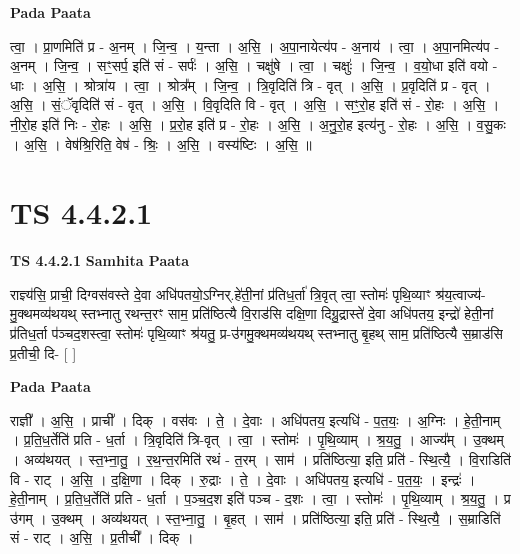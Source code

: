 \documentclass[17pt]{extarticle}
\begin{document}
\textbf{Pada Paata} \newline

त्वा॒ । प्रा॒णमिति॑ प्र - अ॒नम् । जि॒न्व॒ । य॒न्ता । अ॒सि॒ । अ॒पा॒नायेत्य॑प - अ॒नाय॑ । त्वा॒ । अ॒पा॒नमित्य॑प - अ॒नम् । जि॒न्व॒ । सꣳ॒॒सर्प॒ इति॑ सं - सर्पः॑ । अ॒सि॒ । चक्षु॑षे । त्वा॒ । चक्षुः॑ । जि॒न्व॒ । व॒यो॒धा इति॑ वयो - धाः । अ॒सि॒ । श्रोत्रा॑य । त्वा॒ । श्रोत्र᳚म् । जि॒न्व॒ । त्रि॒वृदिति॑ त्रि - वृत् । अ॒सि॒ । प्र॒वृदिति॑ प्र - वृत् । अ॒सि॒ । सं॒ॅवृदिति॑ सं - वृत् । अ॒सि॒ । वि॒वृदिति वि - वृत् । अ॒सि॒ । सꣳ॒॒रो॒ह इति॑ सं - रो॒हः । अ॒सि॒ । नी॒रो॒ह इति॑ निः - रो॒हः । अ॒सि॒ । प्र॒रो॒ह इति॑ प्र - रो॒हः । अ॒सि॒ । अ॒नु॒रो॒ह इत्य॑नु - रो॒हः । अ॒सि॒ । व॒सु॒कः । अ॒सि॒ । वेष॑श्रि॒रिति॒ वेष॑ - श्रिः॒ । अ॒सि॒ । वस्य॑ष्टिः । अ॒सि॒ ॥  \newline




\section*{ TS 4.4.2.1 }

\textbf{TS 4.4.2.1 } \newline
\textbf{Samhita Paata} \newline

राज्ञ्य॑सि॒ प्राची॒ दिग्वस॑वस्ते दे॒वा अधि॑पतयो॒ऽग्निर्.हे॑ती॒नां प्र॑तिध॒र्ता॑ त्रि॒वृत् त्वा॒ स्तोमः॑ पृथि॒व्याꣳ श्र॑य॒त्वाज्य॑-मु॒क्थमव्य॑थयथ् स्तभ्नातु रथन्त॒रꣳ साम॒ प्रति॑ष्ठित्यै वि॒राड॑सि दक्षि॒णा दिग्रु॒द्रास्ते॑ दे॒वा अधि॑पतय॒ इन्द्रो॑ हेती॒नां प्र॑तिध॒र्ता प॑ञ्चद॒शस्त्वा॒ स्तोमः॑ पृथि॒व्याꣳ श्र॑यतु॒ प्र-उ॑गमु॒क्थमव्य॑थयथ् स्तभ्नातु बृ॒हथ् साम॒ प्रति॑ष्ठित्यै स॒म्राड॑सि प्र॒तीची॒ दि- [  ] \newline

\textbf{Pada Paata} \newline

राज्ञी᳚ । अ॒सि॒ । प्राची᳚ । दिक् । वस॑वः । ते॒ । दे॒वाः । अधि॑पतय॒ इत्यधि॑ - प॒त॒यः॒ । अ॒ग्निः । हे॒ती॒नाम् । प्र॒ति॒ध॒र्तेति॑ प्रति - ध॒र्ता । त्रि॒वृदिति॑ त्रि-वृत् । त्वा॒ । स्तोमः॑ । पृ॒थि॒व्याम् । श्र॒य॒तु॒ । आज्य᳚म् । उ॒क्थम् । अव्य॑थयत् । स्त॒भ्ना॒तु॒ । र॒थ॒न्त॒रमिति॑ रथं - त॒रम् । साम॑ । प्रति॑ष्ठित्या॒ इति॒ प्रति॑ - स्थि॒त्यै॒ । वि॒राडिति॑ वि - राट् । अ॒सि॒ । द॒क्षि॒णा । दिक् । रु॒द्राः । ते॒ । दे॒वाः । अधि॑पतय॒ इत्यधि॑ - प॒त॒यः॒ । इन्द्रः॑ । हे॒ती॒नाम् । प्र॒ति॒ध॒र्तेति॑ प्रति - ध॒र्ता । प॒ञ्च॒द॒श इति॑ पञ्च - द॒शः । त्वा॒ । स्तोमः॑ । पृ॒थि॒व्याम् । श्र॒य॒तु॒ । प्र उ॑गम् । उ॒क्थम् । अव्य॑थयत् । स्त॒भ्ना॒तु॒ । बृ॒हत् । साम॑ । प्रति॑ष्ठित्या॒ इति॒ प्रति॑ - स्थि॒त्यै॒ । स॒म्राडिति॑ सं - राट् । अ॒सि॒ । प्र॒तीची᳚ । दिक् ।  \newline
\end{document}
